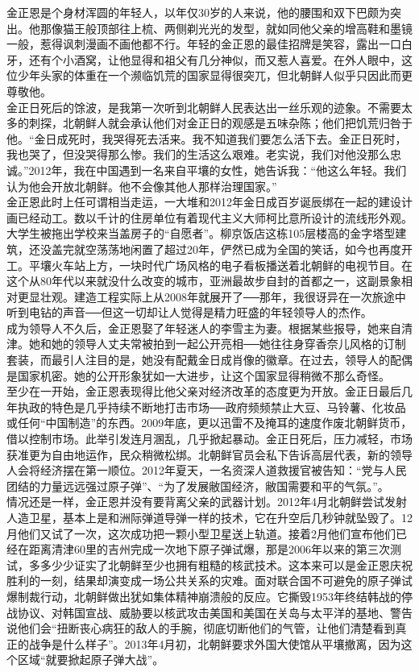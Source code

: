 金正恩是个身材浑圆的年轻人，以年仅30岁的人来说，他的腰围和双下巴颇为突出。他那像猫王般顶部往上梳、两侧剃光光的发型，就如同他父亲的增高鞋和墨镜一般，惹得讽刺漫画不画他都不行。年轻的金正恩的最佳招牌是笑容，露出一口白牙，还有个小酒窝，让他显得和祖父有几分神似，而又惹人喜爱。在外人眼中，这位少年头家的体重在一个濒临饥荒的国家显得很突兀，但北朝鲜人似乎只因此而更尊敬他。\\

金正日死后的馀波，是我第一次听到北朝鲜人民表达出一丝乐观的迹象。不需要太多的刺探，北朝鲜人就会承认他们对金正日的观感是五味杂陈；他们把饥荒归咎于他。“金日成死时，我哭得死去活来。我不知道我们要怎么活下去。金正日死时，我也哭了，但没哭得那么惨。我们的生活这么艰难。老实说，我们对他没那么忠诚。”2012年，我在中国遇到一名来自平壤的女性，她告诉我：“他这么年轻。我们认为他会开放北朝鲜。他不会像其他人那样治理国家。”\\

金正恩此时上任可谓相当走运，一大堆和2012年金日成百岁诞辰绑在一起的建设计画已经动工。数以千计的住房单位有着现代主义大师柯比意所设计的流线形外观。大学生被拖出学校来当盖房子的“自愿者”。柳京饭店这栋105层楼高的金字塔型建筑，还没盖完就空荡荡地闲置了超过20年，俨然已成为全国的笑话，如今也再度开工。平壤火车站上方，一块时代广场风格的电子看板播送着北朝鲜的电视节目。在这个从80年代以来就没什么改变的城市，亚洲最故步自封的首都之一，这副景象相对更显壮观。建造工程实际上从2008年就展开了──那年，我很讶异在一次旅途中听到电钻的声音──但这一切却让人觉得是精力旺盛的年轻领导人的杰作。\\

成为领导人不久后，金正恩娶了年轻迷人的李雪主为妻。根据某些报导，她来自清津。她和她的领导人丈夫常被拍到一起公开亮相──她往往身穿香奈儿风格的订制套装，而最引人注目的是，她没有配戴金日成肖像的徽章。在过去，领导人的配偶是国家机密。她的公开形象犹如一大进步，让这个国家显得稍微不那么奇怪。\\

至少在一开始，金正恩表现得比他父亲对经济改革的态度更为开放。金正日最后几年执政的特色是几乎持续不断地打击市场──政府频频禁止大豆、马铃薯、化妆品或任何“中国制造”的东西。2009年底，更以迅雷不及掩耳的速度作废北朝鲜货币，借以控制市场。此举引发连月溷乱，几乎掀起暴动。金正日死后，压力减轻，市场获准更为自由地运作，民众稍微松绑。北朝鲜官员会私下告诉高层代表，新的领导人会将经济摆在第一顺位。2012年夏天，一名资深人道救援官被告知：“党与人民团结的力量远远强过原子弹”、“为了发展敝国经济，敝国需要和平的气氛。”。\\

情况还是一样，金正恩并没有要背离父亲的武器计划。2012年4月北朝鲜尝试发射人造卫星，基本上是和洲际弹道导弹一样的技术，它在升空后几秒钟就坠毁了。12月他们又试了一次，这次成功把一颗小型卫星送上轨道。接着2月他们宣布他们已经在距离清津60里的吉州完成一次地下原子弹试爆，那是2006年以来的第三次测试，多多少少证实了北朝鲜至少也拥有粗糙的核武技术。这本来可以是金正恩庆祝胜利的一刻，结果却演变成一场公共关系的灾难。面对联合国不可避免的原子弹试爆制裁行动，北朝鲜做出犹如集体精神崩溃般的反应。它撕毁1953年终结韩战的停战协议、对韩国宣战、威胁要以核武攻击美国和美国在关岛与太平洋的基地、警告说他们会“扭断丧心病狂的敌人的手腕，彻底切断他们的气管，让他们清楚看到真正的战争是什么样子”。2013年4月初，北朝鲜要求外国大使馆从平壤撤离，因为这个区域“就要掀起原子弹大战”。\\

